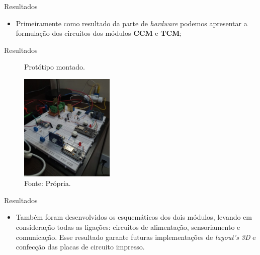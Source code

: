 \begin{frame}{Resultados}
  \begin{itemize}
    \item Primeiramente como resultado da parte de \textit{hardware} podemos apresentar a formulação dos circuitos dos módulos \textbf{CCM} e \textbf{TCM};
  \end{itemize}

\end{frame}
\begin{frame}{Resultados}

  \begin{figure}[H]
    \centering
    \caption{Protótipo montado.}
    \includegraphics[width=0.4\textwidth]{figuras/esquema_protoboard.jpg}
    \caption*{\tiny{Fonte: Própria.}}
    \label{fig:figma_plan_desktop}
  \end{figure}

\end{frame}

\begin{frame}{Resultados}

  \begin{itemize}
    \item Também foram desenvolvidos os esquemáticos dos dois módulos, levando em consideração todas as ligações: circuitos de alimentação, sensoriamento e comunicação. Esse resultado garante futuras implementações de \textit{layout's 3D} e confecção das placas de circuito impresso.
  \end{itemize}

\end{frame}

